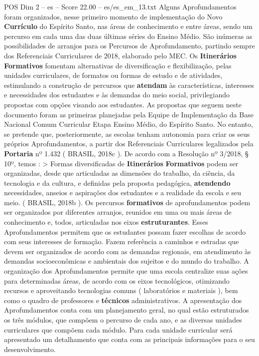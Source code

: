\begin{textsample}{POS Dim 2 – es – Score 22.00 – es/es\_em\_13.txt}
Alguns Aprofundamentos foram organizados, nesse primeiro momento de implementação do Novo \textbf{Currículo} do Espírito Santo, nas áreas de conhecimento e entre áreas, sendo um percurso em cada uma das duas últimas séries do Ensino Médio.
São inúmeras as possibilidades de arranjos para os Percursos de Aprofundamento, partindo sempre dos Referenciais Curriculares de 2018, elaborado pelo MEC.
Os \textbf{Itinerários} \textbf{Formativos} fomentam alternativas de diversificação e flexibilização, pelas unidades curriculares, de formatos ou formas de estudo e de atividades, estimulando a construção de percursos que \textbf{atendam} às características, interesses e necessidades dos estudantes e às demandas do meio social, privilegiando propostas com opções visando aos estudantes.
As propostas que seguem neste documento foram as primeiras planejadas pela Equipe de Implementação da Base Nacional Comum Curricular Etapa Ensino Médio, do Espírito Santo.
No entanto, se pretende que, posteriormente, as escolas tenham autonomia para criar os seus próprios Aprofundamentos, a partir dos Referenciais Curriculares legalizados pela \textbf{Portaria} nº 1.432 ( BRASIL, 2018c ).
De acordo com a Resolução nº 3/2018, § 10º, temos : > Formas diversificadas de \textbf{Itinerários} \textbf{Formativos} podem ser organizadas, desde que articuladas as dimensões do trabalho, da ciência, da tecnologia e da cultura, e definidas pela proposta pedagógica, \textbf{atendendo} necessidades, anseios e aspirações dos estudantes e a realidade da escola e seu meio. ( BRASIL, 2018b ).
Os percursos \textbf{formativos} de aprofundamentos podem ser organizados por diferentes arranjos, reunidos em uma ou mais áreas de conhecimento e, todos, articuladas nos eixos \textbf{estruturantes}.
Esses Aprofundamentos permitem que os estudantes possam fazer escolhas de acordo com seus interesses de formação.
Fazem referência a caminhos e estradas que devem ser organizados de acordo com as demandas regionais, em atendimento às demandas socioeconômicas e ambientais dos sujeitos e do mundo do trabalho.
A organização dos Aprofundamentos permite que uma escola centralize suas ações para determinadas áreas, de acordo com os eixos tecnológicos, otimizando recursos e aproveitando tecnologias comuns ( laboratórios e materiais ), bem como o quadro de professores e \textbf{técnicos} administrativos.
A apresentação dos Aprofundamentos conta com um planejamento geral, no qual estão estruturados os três módulos, que compõem o percurso de cada ano, e as diversas unidades curriculares que compõem cada módulo.
Para cada unidade curricular será apresentado um detalhamento que conta com as principais informações para o seu desenvolvimento.

\end{textsample}
